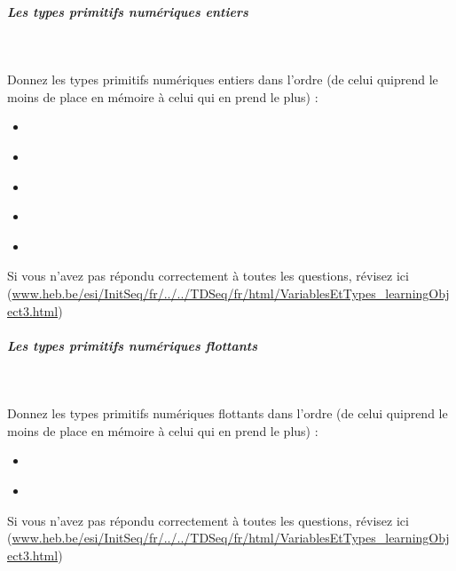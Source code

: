 \documentclass[11pt,a4paper]{article}
\begin{document}
			
		\subparagraph{Les types primitifs num\'eriques entiers} 
		
                \textcolor{white}{.} \par
             
								Donnez les types primitifs num\'eriques entiers dans l'ordre (de celui quiprend le moins de place en m\'emoire \`a celui qui en prend le plus) :
							
					\begin{itemize}
				
			\item  \textcolor{gray}{\underline{\hspace*{3em}}} 
			\item  \textcolor{gray}{\underline{\hspace*{3em}}} 
			\item  \textcolor{gray}{\underline{\hspace*{3em}}} 
			\item  \textcolor{gray}{\underline{\hspace*{2em}}} 
			\item  \textcolor{gray}{\underline{\hspace*{3em}}} 
					\end{itemize}
				Si vous n'avez pas r\'epondu correctement \`a toutes les questions, 
				    r\'evisez ici (\url{www.heb.be/esi/InitSeq/fr/../../TDSeq/fr/html/VariablesEtTypes\_learningObject3.html})
            \par
        
			
		\subparagraph{Les types primitifs num\'eriques flottants} 
		
                \textcolor{white}{.} \par
             
								Donnez les types primitifs num\'eriques flottants dans l'ordre (de celui quiprend le moins de place en m\'emoire \`a celui qui en prend le plus) :
							
					\begin{itemize}
				
			\item  \textcolor{gray}{\underline{\hspace*{3em}}} 
			\item  \textcolor{gray}{\underline{\hspace*{5em}}} 
					\end{itemize}
				Si vous n'avez pas r\'epondu correctement \`a toutes les questions, 
				    r\'evisez ici (\url{www.heb.be/esi/InitSeq/fr/../../TDSeq/fr/html/VariablesEtTypes\_learningObject3.html})
            \par
        
\end{document}

